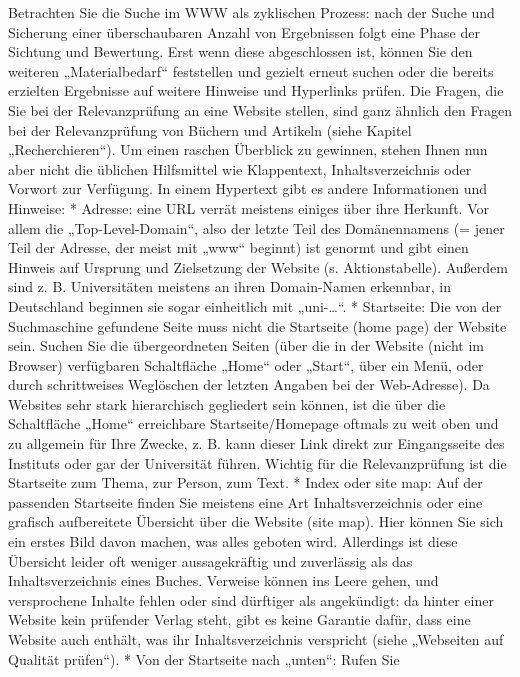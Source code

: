\documentclass[]{book}
\theoremstyle{definition}
\theoremstyle{definition}
\theoremstyle{definition}
\theoremstyle{remark}
\begin{document}
Betrachten Sie die Suche im WWW als zyklischen Prozess: nach der Suche
und Sicherung einer überschaubaren Anzahl von Ergebnissen folgt eine
Phase der Sichtung und Bewertung. Erst wenn diese abgeschlossen ist,
können Sie den weiteren „Materialbedarf`` feststellen und gezielt erneut
suchen oder die bereits erzielten Ergebnisse auf weitere Hinweise und
Hyperlinks prüfen. Die Fragen, die Sie bei der Relevanzprüfung an eine
Website stellen, sind ganz ähnlich den Fragen bei der Relevanzprüfung
von Büchern und Artikeln (siehe Kapitel „Recherchieren``). Um einen
raschen Überblick zu gewinnen, stehen Ihnen nun aber nicht die üblichen
Hilfsmittel wie Klappentext, Inhaltsverzeichnis oder Vorwort zur
Verfügung. In einem Hypertext gibt es andere Informationen und Hinweise:
* Adresse: eine URL verrät meistens einiges über ihre Herkunft. Vor
allem die „Top-Level-Domain``, also der letzte Teil des Domänennamens (=
jener Teil der Adresse, der meist mit „www`` beginnt) ist genormt und
gibt einen Hinweis auf Ursprung und Zielsetzung der Website (s.
Aktionstabelle). Außerdem sind z. B. Universitäten meistens an ihren
Domain-Namen erkennbar, in Deutschland beginnen sie sogar einheitlich
mit „uni-\ldots{}``. * Startseite: Die von der Suchmaschine gefundene
Seite muss nicht die Startseite (home page) der Website sein. Suchen Sie
die übergeordneten Seiten (über die in der Website (nicht im Browser)
verfügbaren Schaltfläche „Home`` oder „Start``, über ein Menü, oder
durch schrittweises Weglöschen der letzten Angaben bei der Web-Adresse).
Da Websites sehr stark hierarchisch gegliedert sein können, ist die über
die Schaltfläche „Home`` erreichbare Startseite/Homepage oftmals zu weit
oben und zu allgemein für Ihre Zwecke, z. B. kann dieser Link direkt zur
Eingangsseite des Instituts oder gar der Universität führen. Wichtig für
die Relevanzprüfung ist die Startseite zum Thema, zur Person, zum Text.
* Index oder site map: Auf der passenden Startseite finden Sie meistens
eine Art Inhaltsverzeichnis oder eine grafisch aufbereitete Übersicht
über die Website (site map). Hier können Sie sich ein erstes Bild davon
machen, was alles geboten wird. Allerdings ist diese Übersicht leider
oft weniger aussagekräftig und zuverlässig als das Inhaltsverzeichnis
eines Buches. Verweise können ins Leere gehen, und versprochene Inhalte
fehlen oder sind dürftiger als angekündigt: da hinter einer Website kein
prüfender Verlag steht, gibt es keine Garantie dafür, dass eine Website
auch enthält, was ihr Inhaltsverzeichnis verspricht (siehe „Webseiten
auf Qualität prüfen``). * Von der Startseite nach „unten``: Rufen Sie
\end{document}
